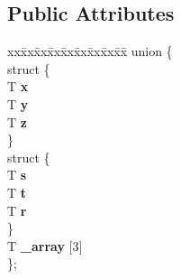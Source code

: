 \subsection*{Public Attributes}
\begin{DoxyCompactItemize}
\item 
\hypertarget{classnv_1_1vec3_a11219b9855afe7e33dbd23e4f45bacae}{}\label{classnv_1_1vec3_a11219b9855afe7e33dbd23e4f45bacae} 
\begin{tabbing}
xx\=xx\=xx\=xx\=xx\=xx\=xx\=xx\=xx\=\kill
union \{\\
\hypertarget{unionnv_1_1vec3_1_1_0D12_a21207cc7091b62ac89d8bc82a9251379}{}\label{unionnv_1_1vec3_1_1_0D12_a21207cc7091b62ac89d8bc82a9251379} 
\>struct \{\\
\>\>T {\bfseries x}\\
\>\>T {\bfseries y}\\
\>\>T {\bfseries z}\\
\>\} \\
\hypertarget{unionnv_1_1vec3_1_1_0D12_a549fc3c8a81fb65200ebe71b6fca6722}{}\label{unionnv_1_1vec3_1_1_0D12_a549fc3c8a81fb65200ebe71b6fca6722} 
\>struct \{\\
\>\>T {\bfseries s}\\
\>\>T {\bfseries t}\\
\>\>T {\bfseries r}\\
\>\} \\
\>T {\bfseries \_array} \mbox{[}3\mbox{]}\\
\}; \\

\end{tabbing}\end{DoxyCompactItemize}

